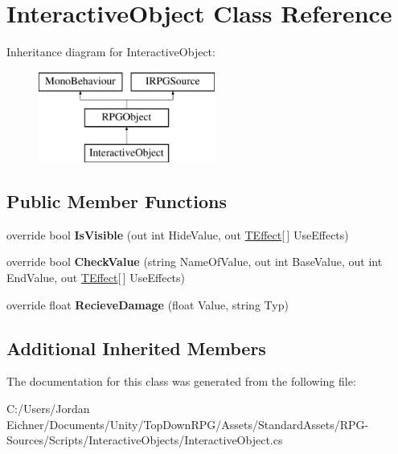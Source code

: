 \hypertarget{class_interactive_object}{}\section{Interactive\+Object Class Reference}
\label{class_interactive_object}
Inheritance diagram for Interactive\+Object\+:\begin{figure}[H]
\begin{center}
\leavevmode
\includegraphics[height=3.000000cm]{class_interactive_object}
\end{center}
\end{figure}
\subsection*{Public Member Functions}
\begin{DoxyCompactItemize}
\item 
\hypertarget{class_interactive_object_abddd2865d50c231e21c2729c26d6466c}{}override bool {\bfseries Is\+Visible} (out int Hide\+Value, out \hyperlink{class_t_effect}{T\+Effect}\mbox{[}$\,$\mbox{]} Use\+Effects)\label{class_interactive_object_abddd2865d50c231e21c2729c26d6466c}

\item 
\hypertarget{class_interactive_object_a28ab335d2f20a2787a6ca2d91511552d}{}override bool {\bfseries Check\+Value} (string Name\+Of\+Value, out int Base\+Value, out int End\+Value, out \hyperlink{class_t_effect}{T\+Effect}\mbox{[}$\,$\mbox{]} Use\+Effects)\label{class_interactive_object_a28ab335d2f20a2787a6ca2d91511552d}

\item 
\hypertarget{class_interactive_object_af7977dcb81d6bc5a8714e5ade8013ae8}{}override float {\bfseries Recieve\+Damage} (float Value, string Typ)\label{class_interactive_object_af7977dcb81d6bc5a8714e5ade8013ae8}

\end{DoxyCompactItemize}
\subsection*{Additional Inherited Members}


The documentation for this class was generated from the following file\+:\begin{DoxyCompactItemize}
\item 
C\+:/\+Users/\+Jordan Eichner/\+Documents/\+Unity/\+Top\+Down\+R\+P\+G/\+Assets/\+Standard\+Assets/\+R\+P\+G-\/\+Sources/\+Scripts/\+Interactive\+Objects/Interactive\+Object.\+cs\end{DoxyCompactItemize}
